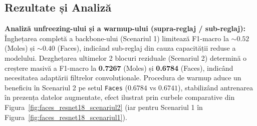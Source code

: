 \documentclass[12pt,a4paper]{article}
\begin{document}
\subsection{Rezultate și Analiză}
\begin{table}[h!]
\centering
\setlength{\tabcolsep}{4pt}
\caption{Impactul dezghețării selective și al warmup-ului pe ResNet-18}
\end{table}

\textbf{Analiză unfreezing-ului și a warmup-ului (supra-reglaj / sub-reglaj):}\\
Înghețarea completă a backbone-ului (Scenariul 1) limitează F1-macro la $\sim 0.52$ (Moles) și $\sim 0.40$ (Faces), indicând sub-reglaj din cauza capacității reduse a modelului. Dezghețarea ultimelor 2 blocuri reziduale (Scenariul 2) determină o creștere masivă a F1-macro la \textbf{0.7267} (Moles) și \textbf{0.6784} (Faces), indicând necesitatea adaptării filtrelor convoluționale. Procedura de warmup aduce un beneficiu în Scenariul 2 pe setul \texttt{Faces} ($0.6784$ vs $0.6741$), stabilizând antrenarea în prezența datelor augmentate, efect ilustrat prin curbele comparative din Figura~\ref{fig:faces_resnet18_scenariul2} (iar pentru Scenariul 1 în Figura~\ref{fig:faces_resnet18_scenariul1}).
\end{document}

